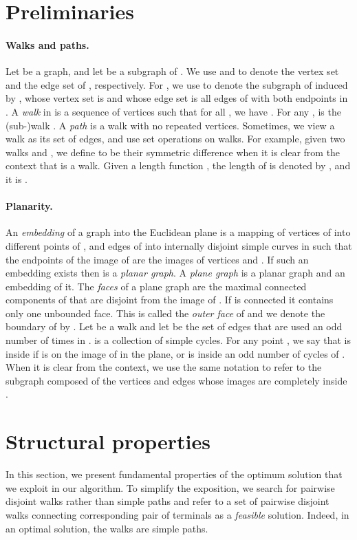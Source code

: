 \documentclass[11pt,twoside]{article}
\newcommand{\EMPH}[1]{\emph{#1}}
\begin{document}
\section{Preliminaries}

\paragraph{Walks and paths.} Let  be a graph, and let  be a subgraph of .  We use  and  to denote the vertex set and the edge set of , respectively.  For , we use \EMPH{} to denote the subgraph of  induced by , whose vertex set is  and whose edge set is all edges of  with both endpoints in .  A \EMPH{walk}  in  is a sequence of vertices such that for all , we have .  For any , \EMPH{} is the (sub-)walk .
A \EMPH{path} is a walk with no repeated vertices.  Sometimes, we view a walk as its set of edges, and use set operations on walks.  For example, given two walks  and , we define  to be their symmetric difference when it is clear from the context that  is a walk.  Given a length function , the length of  is denoted by \EMPH{}, and it is .

\paragraph{Planarity.}
An \EMPH{embedding} of a graph  into the Euclidean plane is a mapping of vertices of  into different points of , and edges of  into internally disjoint simple curves in  such that the endpoints of the image of  are the images of vertices  and .  If such an embedding exists then  is a \EMPH{planar graph}.  A \EMPH{plane graph} is a planar graph and an embedding of it.  The \EMPH{faces} of a plane graph  are the maximal connected components of  that are disjoint from the image of .  If  is connected it contains only one unbounded face.  This is called the \EMPH{outer face} of  and we denote the boundary of  by .
Let  be a walk and let  be the set of edges that are used an odd number of times in .  
 is a collection of simple cycles.  For any point , we say that  is inside  if  is on the image of  in the plane, or  is inside an odd number of cycles of .
When it is clear from the context, we use the same notation to refer to the subgraph composed of the vertices and edges whose images are completely inside . 


\section{Structural properties}
In this section, we present fundamental properties of the optimum solution that we exploit in our algorithm.
To simplify the exposition, we search for pairwise disjoint walks rather than simple paths and refer to a set of pairwise disjoint walks connecting corresponding pair of terminals as a \emph{feasible} solution.
Indeed, in an optimal solution, the walks are simple paths.
\end{document}
